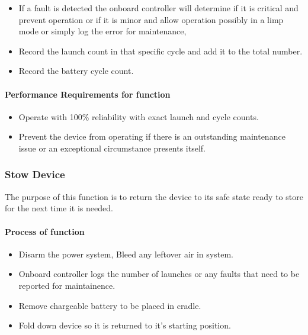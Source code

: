 \documentclass[a4paper,10pt]{article} %
\begin{document}
\begin{itemize}
    \item If a fault is detected the onboard controller will determine if it is critical and prevent operation or if it is minor and allow operation possibly in a limp mode or simply log the error for maintenance,
    \item Record the launch count in that specific cycle and add it to the total number.
    \item Record the battery cycle count.
\end{itemize}

\paragraph{Performance Requirements for function}

\begin{itemize}
    \item Operate with 100\% reliability with exact launch and cycle counts.
    \item Prevent the device from operating if there is an outstanding maintenance issue or an exceptional circumstance presents itself.
\end{itemize}





\subsubsection{Stow Device}

The purpose of this function is to return the device to its safe state ready to store for the next time it is needed.

\paragraph{Process of function}


\begin{itemize}
    \item Disarm the power system, Bleed any leftover air in system.
    \item Onboard controller logs the number of launches or any faults that need to be reported for maintainence.
    \item Remove chargeable battery to be placed in cradle.
    \item Fold down device so it is returned to it's starting position.
\end{itemize}
\end{document}
